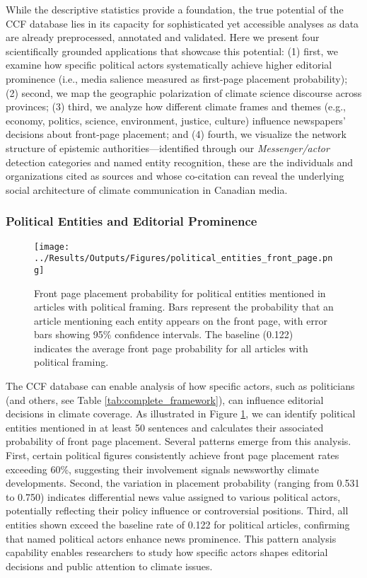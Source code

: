 \documentclass[12pt]{article}
\begin{document}
While the descriptive statistics provide a foundation, the true potential of the CCF database lies in its capacity for sophisticated yet accessible analyses as data are already preprocessed, annotated and validated. Here we present four scientifically grounded applications that showcase this potential: (1) first, we examine how specific political actors systematically achieve higher editorial prominence (i.e., media salience measured as first-page placement probability); (2) second, we map the geographic polarization of climate science discourse across provinces; (3) third, we analyze how different climate frames and themes (e.g., economy, politics, science, environment, justice, culture) influence newspapers' decisions about front-page placement; and (4) fourth, we visualize the network structure of epistemic authorities—identified through our \emph{Messenger/actor} detection categories and named entity recognition, these are the individuals and organizations cited as sources and whose co-citation can reveal the underlying social architecture of climate communication in Canadian media.

\subsubsection{Political Entities and Editorial Prominence}

\begin{figure}[!b]
\vspace*{\fill}
\centering
\texttt{[image: ../Results/Outputs/Figures/political\_entities\_front\_page.png]}
\caption{Front page placement probability for political entities mentioned in articles with political framing. Bars represent the probability that an article mentioning each entity appears on the front page, with error bars showing 95\% confidence intervals. The baseline (0.122) indicates the average front page probability for all articles with political framing.}
\label{fig:political_entities}
\vspace*{0pt}
\end{figure}

The CCF database can enable analysis of how specific actors, such as politicians (and others, see Table \ref{tab:complete_framework}), can influence editorial decisions in climate coverage. As illustrated in Figure \ref{fig:political_entities}, we can identify political entities mentioned in at least 50 sentences and calculates their associated probability of front page placement. Several patterns emerge from this analysis. First, certain political figures consistently achieve front page placement rates exceeding 60\%, suggesting their involvement signals newsworthy climate developments. Second, the variation in placement probability (ranging from 0.531 to 0.750) indicates differential news value assigned to various political actors, potentially reflecting their policy influence or controversial positions. Third, all entities shown exceed the baseline rate of 0.122 for political articles, confirming that named political actors enhance news prominence. This pattern analysis capability enables researchers to study how specific actors shapes editorial decisions and public attention to climate issues.
\end{document}
